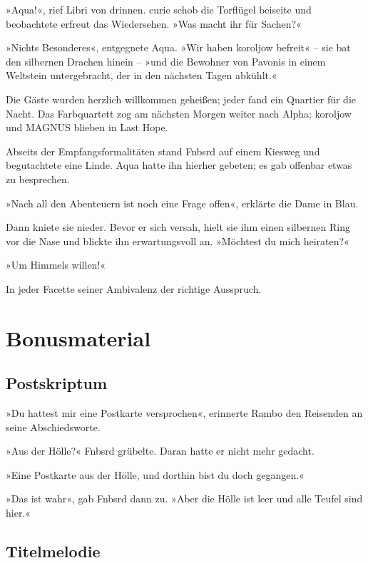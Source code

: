 »Aqua!«, rief Libri von drinnen. curie schob die Torflügel beiseite und beobachtete erfreut das Wiedersehen. »Was macht ihr für Sachen?«

»Nichts Besonderes«, entgegnete Aqua. »Wir haben koroljow befreit« – sie bat den silbernen Drachen hinein – »und die Bewohner von Pavonis in einem Weltstein untergebracht, der in den nächsten Tagen abkühlt.«

Die Gäste wurden herzlich willkommen geheißen; jeder fand ein Quartier für die Nacht. Das Farbquartett zog am nächsten Morgen weiter nach Alpha; koroljow und MAGNUS blieben in Last Hope.

Abseits der Empfangsformalitäten stand Fnbsrd auf einem Kiesweg und begutachtete eine Linde. Aqua hatte ihn hierher gebeten; es gab offenbar etwas zu besprechen.

»Nach all den Abenteuern ist noch eine Frage offen«, erklärte die Dame in Blau.

Dann kniete sie nieder. Bevor er sich versah, hielt sie ihm einen silbernen Ring vor die Nase und blickte ihn erwartungsvoll an. »Möchtest du mich heiraten?«

»Um Himmels willen!«

In jeder Facette seiner Ambivalenz der richtige Ausspruch.


\part{Bonusmaterial}

\chapter {Postskriptum}

»Du hattest mir eine Postkarte versprochen«, erinnerte Rambo den Reisenden an seine Abschiedsworte.

»Aus der Hölle?« Fnbsrd grübelte. Daran hatte er nicht mehr gedacht.

»Eine Postkarte aus der Hölle, und dorthin bist du doch gegangen.«

»Das ist wahr«, gab Fnbsrd dann zu. »Aber die Hölle ist leer und alle Teufel sind hier.«


\chapter{Titelmelodie}

